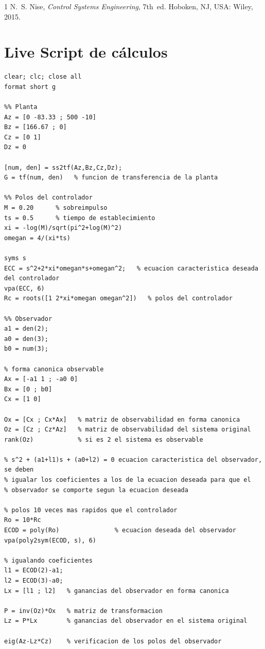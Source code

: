 \documentclass[conference]{IEEEtran}
\begin{document}
\begin{thebibliography}{1}
N.~S. Nise, \emph{Control Systems Engineering}, 7th~ed. Hoboken, NJ, USA: Wiley, 2015.

\end{thebibliography}

\appendices
\section{Live Script de cálculos}
\label{ap:livescript}

\begin{lstlisting}
clear; clc; close all
format short g

%% Planta
Az = [0 -83.33 ; 500 -10]
Bz = [166.67 ; 0]
Cz = [0 1]
Dz = 0

[num, den] = ss2tf(Az,Bz,Cz,Dz);
G = tf(num, den)   % funcion de transferencia de la planta

%% Polos del controlador
M = 0.20      % sobreimpulso
ts = 0.5      % tiempo de establecimiento
xi = -log(M)/sqrt(pi^2+log(M)^2)
omegan = 4/(xi*ts)

syms s
ECC = s^2+2*xi*omegan*s+omegan^2;   % ecuacion caracteristica deseada del controlador
vpa(ECC, 6)
Rc = roots([1 2*xi*omegan omegan^2])   % polos del controlador

%% Observador
a1 = den(2);
a0 = den(3);
b0 = num(3);

% forma canonica observable
Ax = [-a1 1 ; -a0 0]
Bx = [0 ; b0]
Cx = [1 0]

Ox = [Cx ; Cx*Ax]   % matriz de observabilidad en forma canonica
Oz = [Cz ; Cz*Az]   % matriz de observabilidad del sistema original
rank(Oz)            % si es 2 el sistema es observable

% s^2 + (a1+l1)s + (a0+l2) = 0 ecuacion caracteristica del observador, se deben
% igualar los coeficientes a los de la ecuacion deseada para que el
% observador se comporte segun la ecuacion deseada

% polos 10 veces mas rapidos que el controlador
Ro = 10*Rc
ECOD = poly(Ro)               % ecuacion deseada del observador
vpa(poly2sym(ECOD, s), 6)

% igualando coeficientes
l1 = ECOD(2)-a1;
l2 = ECOD(3)-a0;
Lx = [l1 ; l2]   % ganancias del observador en forma canonica

P = inv(Oz)*Ox   % matriz de transformacion
Lz = P*Lx        % ganancias del observador en el sistema original

eig(Az-Lz*Cz)    % verificacion de los polos del observador


\end{lstlisting}
\end{document}
